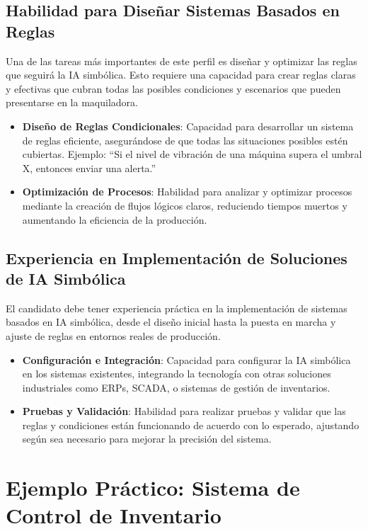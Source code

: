 \subsection{Habilidad para Diseñar Sistemas Basados en Reglas}

Una de las tareas más importantes de este perfil es diseñar y optimizar las reglas que seguirá la IA simbólica. Esto requiere una capacidad para crear reglas claras y efectivas que cubran todas las posibles condiciones y escenarios que pueden presentarse en la maquiladora.

\begin{itemize}
    \item \textbf{Diseño de Reglas Condicionales}: Capacidad para desarrollar un sistema de reglas eficiente, asegurándose de que todas las situaciones posibles estén cubiertas. Ejemplo: ``Si el nivel de vibración de una máquina supera el umbral X, entonces enviar una alerta.''
    \item \textbf{Optimización de Procesos}: Habilidad para analizar y optimizar procesos mediante la creación de flujos lógicos claros, reduciendo tiempos muertos y aumentando la eficiencia de la producción.
\end{itemize}

\subsection{Experiencia en Implementación de Soluciones de IA Simbólica}

El candidato debe tener experiencia práctica en la implementación de sistemas basados en IA simbólica, desde el diseño inicial hasta la puesta en marcha y ajuste de reglas en entornos reales de producción.

\begin{itemize}
    \item \textbf{Configuración e Integración}: Capacidad para configurar la IA simbólica en los sistemas existentes, integrando la tecnología con otras soluciones industriales como ERPs, SCADA, o sistemas de gestión de inventarios.
    \item \textbf{Pruebas y Validación}: Habilidad para realizar pruebas y validar que las reglas y condiciones están funcionando de acuerdo con lo esperado, ajustando según sea necesario para mejorar la precisión del sistema.
\end{itemize}

\section{Ejemplo Práctico: Sistema de Control de Inventario}\label{ejemplo-control-inventario}

